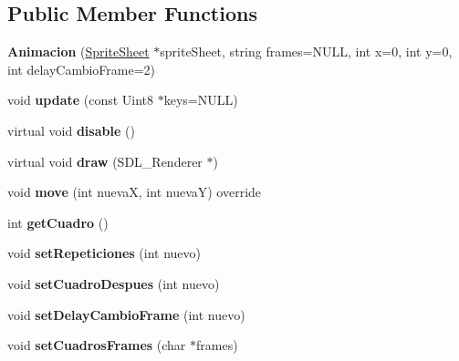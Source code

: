 \subsection*{Public Member Functions}
\begin{DoxyCompactItemize}
\item 
{\bfseries Animacion} (\hyperlink{class_sprite_sheet}{Sprite\+Sheet} $\ast$sprite\+Sheet, string frames=N\+U\+LL, int x=0, int y=0, int delay\+Cambio\+Frame=2)\hypertarget{class_animacion_a42e4ac80569912ad50fcf23bce937908}{}\label{class_animacion_a42e4ac80569912ad50fcf23bce937908}

\item 
void {\bfseries update} (const Uint8 $\ast$keys=N\+U\+LL)\hypertarget{class_animacion_a9b52991c0710843e085326053b2ee568}{}\label{class_animacion_a9b52991c0710843e085326053b2ee568}

\item 
virtual void {\bfseries disable} ()\hypertarget{class_animacion_a02481ecab981d05dd0c50b46abb3f341}{}\label{class_animacion_a02481ecab981d05dd0c50b46abb3f341}

\item 
virtual void {\bfseries draw} (S\+D\+L\+\_\+\+Renderer $\ast$)\hypertarget{class_animacion_aee1eedfd331fb9cd1dbfdaf7550a866a}{}\label{class_animacion_aee1eedfd331fb9cd1dbfdaf7550a866a}

\item 
void {\bfseries move} (int nuevaX, int nuevaY) override\hypertarget{class_animacion_ae596bf2bc41b8a733fe5e2fae98b7850}{}\label{class_animacion_ae596bf2bc41b8a733fe5e2fae98b7850}

\item 
int {\bfseries get\+Cuadro} ()\hypertarget{class_animacion_aefb08950e8376addb0064df9fc39714a}{}\label{class_animacion_aefb08950e8376addb0064df9fc39714a}

\item 
void {\bfseries set\+Repeticiones} (int nuevo)\hypertarget{class_animacion_aa06923448345136fbd5d9d3b186168e9}{}\label{class_animacion_aa06923448345136fbd5d9d3b186168e9}

\item 
void {\bfseries set\+Cuadro\+Despues} (int nuevo)\hypertarget{class_animacion_aba6827dd1b9aa6ed1b8d92dd791d9195}{}\label{class_animacion_aba6827dd1b9aa6ed1b8d92dd791d9195}

\item 
void {\bfseries set\+Delay\+Cambio\+Frame} (int nuevo)\hypertarget{class_animacion_af9b3e2e5873daef7b1aa83d70d286596}{}\label{class_animacion_af9b3e2e5873daef7b1aa83d70d286596}

\item 
void {\bfseries set\+Cuadros\+Frames} (char $\ast$frames)\hypertarget{class_animacion_adfa64326dc3e8897449874cd89c409eb}{}\label{class_animacion_adfa64326dc3e8897449874cd89c409eb}

\end{DoxyCompactItemize}
